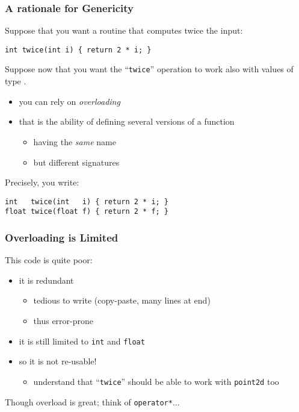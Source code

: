 \documentclass{beamer}
\newcommand{\kw}[1]{{\color{blue}{\texttt{#1}}}\xspace}
\newcommand{\code}[1]{{\scriptsize{\texttt{#1}}}\xspace}
\newcommand{\pointIId}{\code{point2d}}
\begin{document}
\begin{frame}[fragile]
  \frametitle{A rationale for Genericity}

Suppose that you want a routine that computes twice the input:
\begin{lstlisting}
int twice(int i) { return 2 * i; }
\end{lstlisting}

Suppose now that you want the ``\code{twice}'' operation to work also
with values of type \kw{float}.

\begin{itemize}
\item you can rely on \emph{overloading}
\item that is the ability of defining several versions of a function
  \begin{itemize}
  \item having the \emph{same} name
  \item but different signatures
  \end{itemize}
\end{itemize}

Precisely, you write:
\begin{lstlisting}
int   twice(int   i) { return 2 * i; }
float twice(float f) { return 2 * f; }
\end{lstlisting}

\end{frame}


\begin{frame}
  \frametitle{Overloading is Limited}

This code is quite poor:

\begin{itemize}
\item it is redundant
  \begin{itemize}
  \item tedious to write (copy-paste, many lines at end)
  \item thus error-prone
  \end{itemize}
  \smallskip
\item it is still limited to \code{int} and \code{float}
  \smallskip
\item so it is not re-usable!
  \begin{itemize}
  \item understand that ``\code{twice}'' should be able to work with
    \pointIId too
  \end{itemize}
\end{itemize}

Though overload is great; think of \code{operator*}...

\end{frame}
\end{document}
